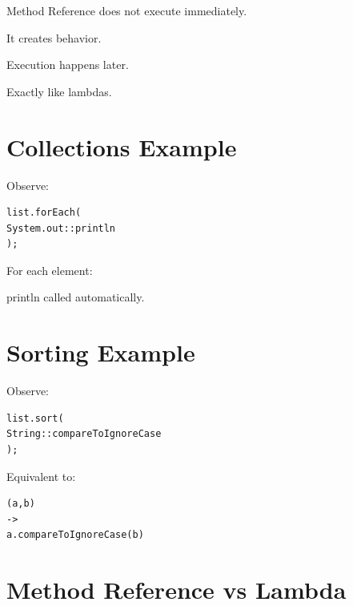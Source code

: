 \documentclass[11pt,a4paper]{book}
\begin{document}
Method Reference does not
execute immediately.


It creates behavior.


Execution happens later.


Exactly like lambdas.


\section{Collections Example}

Observe:

\begin{verbatim} 
list.forEach(
System.out::println
);
\end{verbatim}


For each element:


println called automatically.


\section{Sorting Example}

Observe:

\begin{verbatim} 
list.sort(
String::compareToIgnoreCase
);
\end{verbatim}


Equivalent to:

\begin{verbatim} 
(a,b)
->
a.compareToIgnoreCase(b)
\end{verbatim}


\section{Method Reference vs Lambda}
\end{document}
